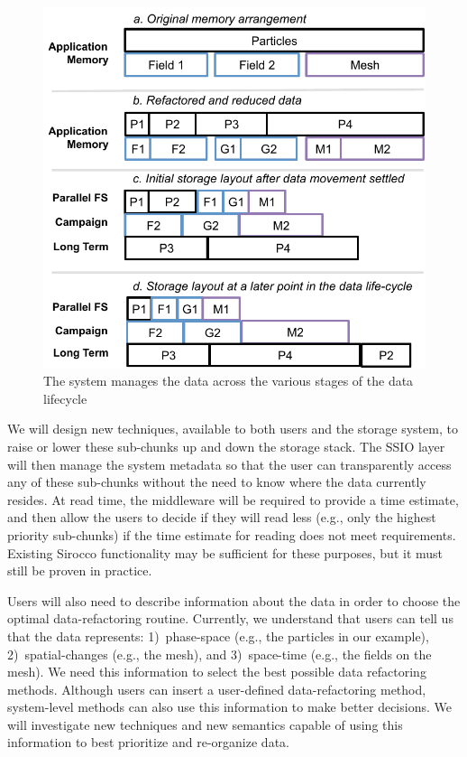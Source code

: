 %
\begin{figure}
        \vspace{-2ex}
        \begin{centering} 
	\includegraphics[scale=0.8]{graphics/SSIO-bucket.pdf}
        \caption{The system manages the data across the various stages of the data lifecycle}
        \label{fig:ssio-bucket}
        \end{centering}
       \vspace{-1ex}
\end{figure}


We will design new techniques, available to both users and the storage system,
to raise or lower these sub-chunks up and
down the storage stack. The SSIO layer will then manage the system metadata so
that the user can transparently access any of these sub-chunks without
the need to know where the data currently resides.
At read time, the middleware will be required to 
provide a time estimate, and then allow the users to decide if
they will read less (e.g., only the highest priority sub-chunks)
if the time estimate
for reading does not meet requirements. Existing Sirocco functionality may be
sufficient for these purposes, but it must still be proven in practice.
%

Users will also need to describe information about the data in order to choose
the optimal data-refactoring routine. Currently, we understand that
users can tell us that the data represents: 1)~phase-space (e.g., the particles
in our example), 2)~spatial-changes (e.g., the mesh), and 3)~space-time (e.g.,
the fields on the mesh). We need this information to select
the best possible data
refactoring methods. Although users can insert a user-defined data-refactoring
method, system-level methods can also use this information to make better decisions.
We will investigate new techniques and new semantics capable of using
this information to best prioritize and re-organize data.

